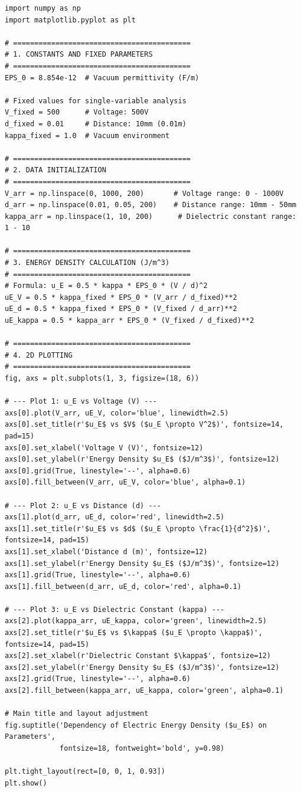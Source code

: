 \begin{lstlisting}[style=pythonstyle, caption={Đoạn code 2D tính mật độ năng lượng $u_E$}]
import numpy as np
import matplotlib.pyplot as plt

# ==========================================
# 1. CONSTANTS AND FIXED PARAMETERS
# ==========================================
EPS_0 = 8.854e-12  # Vacuum permittivity (F/m)

# Fixed values for single-variable analysis
V_fixed = 500      # Voltage: 500V
d_fixed = 0.01     # Distance: 10mm (0.01m)
kappa_fixed = 1.0  # Vacuum environment

# ==========================================
# 2. DATA INITIALIZATION
# ==========================================
V_arr = np.linspace(0, 1000, 200)       # Voltage range: 0 - 1000V
d_arr = np.linspace(0.01, 0.05, 200)    # Distance range: 10mm - 50mm
kappa_arr = np.linspace(1, 10, 200)      # Dielectric constant range: 1 - 10

# ==========================================
# 3. ENERGY DENSITY CALCULATION (J/m^3)
# ==========================================
# Formula: u_E = 0.5 * kappa * EPS_0 * (V / d)^2
uE_V = 0.5 * kappa_fixed * EPS_0 * (V_arr / d_fixed)**2
uE_d = 0.5 * kappa_fixed * EPS_0 * (V_fixed / d_arr)**2
uE_kappa = 0.5 * kappa_arr * EPS_0 * (V_fixed / d_fixed)**2

# ==========================================
# 4. 2D PLOTTING
# ==========================================
fig, axs = plt.subplots(1, 3, figsize=(18, 6))

# --- Plot 1: u_E vs Voltage (V) ---
axs[0].plot(V_arr, uE_V, color='blue', linewidth=2.5)
axs[0].set_title(r'$u_E$ vs $V$ ($u_E \propto V^2$)', fontsize=14, pad=15)
axs[0].set_xlabel('Voltage V (V)', fontsize=12)
axs[0].set_ylabel(r'Energy Density $u_E$ ($J/m^3$)', fontsize=12)
axs[0].grid(True, linestyle='--', alpha=0.6)
axs[0].fill_between(V_arr, uE_V, color='blue', alpha=0.1)

# --- Plot 2: u_E vs Distance (d) ---
axs[1].plot(d_arr, uE_d, color='red', linewidth=2.5)
axs[1].set_title(r'$u_E$ vs $d$ ($u_E \propto \frac{1}{d^2}$)', fontsize=14, pad=15)
axs[1].set_xlabel('Distance d (m)', fontsize=12)
axs[1].set_ylabel(r'Energy Density $u_E$ ($J/m^3$)', fontsize=12)
axs[1].grid(True, linestyle='--', alpha=0.6)
axs[1].fill_between(d_arr, uE_d, color='red', alpha=0.1)

# --- Plot 3: u_E vs Dielectric Constant (kappa) ---
axs[2].plot(kappa_arr, uE_kappa, color='green', linewidth=2.5)
axs[2].set_title(r'$u_E$ vs $\kappa$ ($u_E \propto \kappa$)', fontsize=14, pad=15)
axs[2].set_xlabel(r'Dielectric Constant $\kappa$', fontsize=12)
axs[2].set_ylabel(r'Energy Density $u_E$ ($J/m^3$)', fontsize=12)
axs[2].grid(True, linestyle='--', alpha=0.6)
axs[2].fill_between(kappa_arr, uE_kappa, color='green', alpha=0.1)

# Main title and layout adjustment
fig.suptitle('Dependency of Electric Energy Density ($u_E$) on Parameters', 
             fontsize=18, fontweight='bold', y=0.98)

plt.tight_layout(rect=[0, 0, 1, 0.93])
plt.show()
\end{lstlisting}

